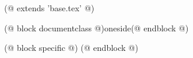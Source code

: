 (@ extends 'base.tex' @)

(@ block documentclass @)oneside(@ endblock @)

(@ block specific @)
(@ endblock @)
